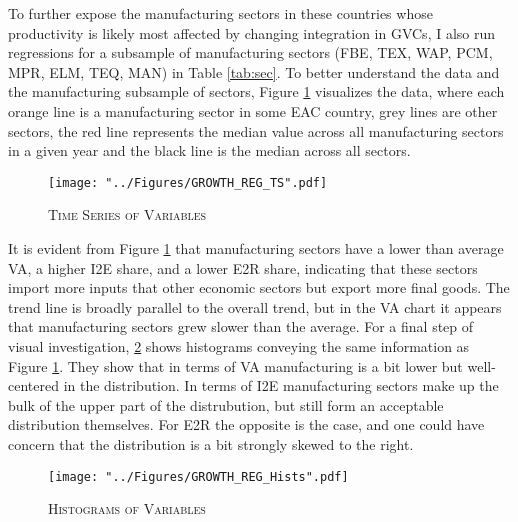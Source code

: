 \documentclass[a4paper]{article}
\begin{document}
To further expose the manufacturing sectors in these countries whose productivity is likely most affected by changing integration in GVCs, I also run regressions for a subsample of manufacturing sectors (FBE, TEX, WAP, PCM, MPR, ELM, TEQ, MAN) in Table \ref{tab:sec}. To better understand the data and the manufacturing subsample of sectors, Figure \ref{fig:GROWTH_REG_TS} visualizes the data, where each orange line is a manufacturing sector in some EAC country, grey lines are other sectors, the red line represents the median value across all manufacturing sectors in a given year and the black line is the median across all sectors.  


\begin{figure}[h!]
\centering
\caption{\label{fig:GROWTH_REG_TS}\textsc{Time Series of Variables}}
\texttt{[image: "../Figures/GROWTH\_REG\_TS".pdf]} %
\end{figure}
\FloatBarrier

It is evident from Figure \ref{fig:GROWTH_REG_TS} that manufacturing sectors have a lower than average VA, a higher I2E share, and a lower E2R share, indicating that these sectors import more inputs that other economic sectors but export more final goods. The trend line is broadly parallel to the overall trend, but in the VA chart it appears that manufacturing sectors grew slower than the average. For a final step of visual investigation, \ref{fig:GROWTH_REG_Hists} shows histograms conveying the same information as Figure \ref{fig:GROWTH_REG_TS}. They show that in terms of VA manufacturing is a bit lower but well-centered in the distribution. In terms of I2E manufacturing sectors make up the bulk of the upper part of the distrubution, but still form an acceptable distribution themselves. For E2R the opposite is the case, and one could have concern that the distribution is a bit strongly skewed to the right. 

\begin{figure}[h!]
\centering
\caption{\label{fig:GROWTH_REG_Hists}\textsc{Histograms of Variables}}
\texttt{[image: "../Figures/GROWTH\_REG\_Hists".pdf]} %
\end{figure}
\FloatBarrier
\end{document}
